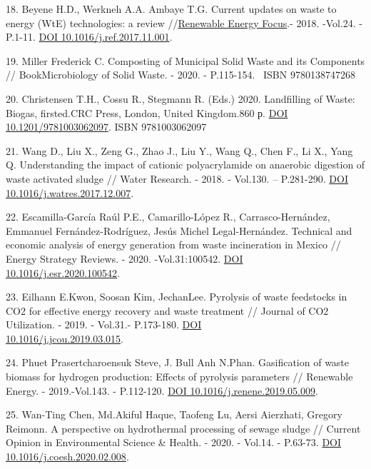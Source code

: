\begin{references}
18. Beyene H.D., Werkneh A.A. Ambaye T.G. Current updates on waste to
energy (WtE) technologies: a review
//\href{https://www.sciencedirect.com/journal/renewable-energy-focus}{Renewable
Energy Focus}.- 2018. -Vol.24. -P.1-11.
\href{https://doi.org/10.1016/j.ref.2017.11.001}{DOI
10.1016/j.ref.2017.11.001}.

19. Miller Frederick C. Composting of Municipal Solid Waste and its
Components // BookMicrobiology of Solid Waste. - 2020. - P.115-154.
~ISBN 9780138747268

20. Christensen T.H., Cossu R., Stegmann R. (Eds.) 2020. Landfilling of
Waste: Biogas, firsted.CRC Press, London, United Kingdom.860 р.
\href{https://doi.org/10.1201/9781003062097}{DOI 10.1201/9781003062097}.
ISBN 9781003062097

21. Wang D., Liu X., Zeng G., Zhao J., Liu Y., Wang Q., Chen F., Li X.,
Yang Q. Understanding the impact of cationic polyacrylamide on anaerobic
digestion of waste activated sludge // Water Research. - 2018. -
Vol.130. -- P.281-290.
\href{https://doi.org/10.1016/j.watres.2017.12.007}{DOI
10.1016/j.watres.2017.12.007}.

22. Escamilla-García Raúl P.E., Camarillo-López R., Carrasco-Hernández,
Emmanuel Fernández-Rod\-ríguez, Jesús Michel Legal-Hernández. Technical
and economic analysis of energy generation from waste incineration in
Mexico // Energy Strategy Reviews. - 2020. -Vol.31:100542.
\href{https://doi.org/10.1016/j.esr.2020.100542}{DOI\\
10.1016/j.esr.2020.100542}.

23. Eilhann E.Kwon, Soosan Kim, JechanLee. Pyrolysis of waste feedstocks
in CO2 for effective energy recovery and waste treatment // Journal of
CO2 Utilization. - 2019. - Vol.31.- P.173-180.
\href{https://doi.org/10.1016/j.jcou.2019.03.015}{DOI\\
10.1016/j.jcou.2019.03.015}.

24. Phuet Prasertcharoensuk Steve, J. Bull Anh N.Phan. Gasification of
waste biomass for hydrogen production: Effects of pyrolysis parameters
// Renewable Energy. - 2019.-Vol.143. - P.112-120.
\href{https://doi.org/10.1016/j.renene.2019.05.009}{DOI
10.1016/j.renene.2019.05.009}.

25. Wan-Ting Chen, Md.Akiful Haque, Taofeng Lu, Aersi Aierzhati, Gregory
Reimonn. A perspective on hydrothermal processing of sewage sludge //
Current Opinion in Environmental Science \& Health. - 2020. - Vol.14. -
P.63-73. \href{https://doi.org/10.1016/j.coesh.2020.02.008}{DOI
10.1016/j.coesh.2020.02.008}.


\end{references}

